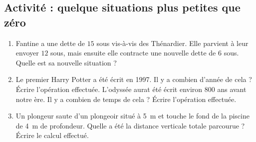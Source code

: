 
\subsection*{Activité : quelque situations plus petites que zéro}

\begin{enumerate}
    \item
        Fantine a une dette de \( 15\) sous vis-à-vis des Thénardier. Elle parvient à leur envoyer \( 12\) sous, mais ensuite elle contracte une nouvelle dette de \( 6\) sous. Quelle est sa nouvelle situation ?
    \item
        Le premier Harry Potter a été écrit en 1997. Il y a combien d'année de cela ? Écrire l'opération effectuée. L'odyssée aurat été écrit environ \( 800\) ans avant notre ère. Il y a combien de temps de cela ? Écrire l'opération effectuée.
    \item
        Un plongeur saute d'un plongeoir situé à \SI{5}{\meter} et touche le fond de la piscine de \SI{4}{\meter} de profondeur. Quelle a été la distance verticale totale parcourue ? Écrire le calcul effectué.

\end{enumerate}

